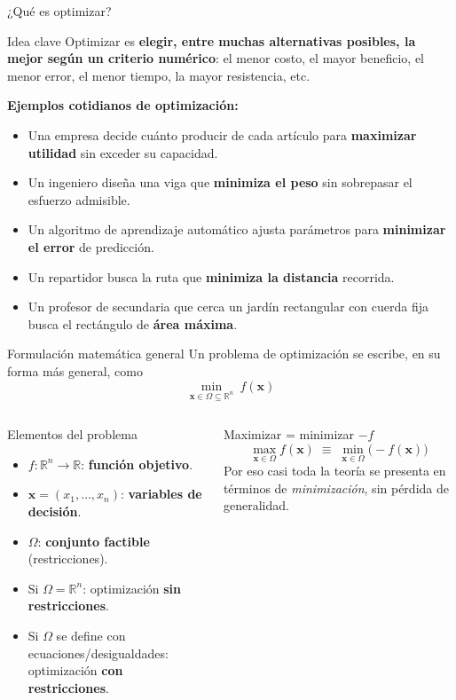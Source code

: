 \documentclass[aspectratio=169,10pt]{beamer}
\newcommand{\R}{\mathbb{R}}
\newcommand{\x}{\mathbf{x}}
\begin{document}
\begin{frame}{¿Qué es optimizar?}
  \begin{alertblock}{Idea clave}
    Optimizar es \textbf{elegir, entre muchas alternativas posibles, la mejor
    según un criterio numérico}: el menor costo, el mayor beneficio, el menor
    error, el menor tiempo, la mayor resistencia, etc.
  \end{alertblock}
  \vspace{0.3cm}
  \textbf{Ejemplos cotidianos de optimización:}
  \begin{itemize}
    \item Una empresa decide cuánto producir de cada artículo para
      \textbf{maximizar utilidad} sin exceder su capacidad.
    \item Un ingeniero diseña una viga que \textbf{minimiza el peso} sin
      sobrepasar el esfuerzo admisible.
    \item Un algoritmo de aprendizaje automático ajusta parámetros para
      \textbf{minimizar el error} de predicción.
    \item Un repartidor busca la ruta que \textbf{minimiza la distancia}
      recorrida.
    \item Un profesor de secundaria que cerca un jardín rectangular con
      cuerda fija busca el rectángulo de \textbf{área máxima}.
  \end{itemize}
\end{frame}

\begin{frame}{Formulación matemática general}
  Un problema de optimización se escribe, en su forma más general, como
  \[
    \min_{\x \in \Omega \subseteq \R^n} \ f(\x)
  \]
  \begin{columns}
    \begin{block}{Elementos del problema}
      \begin{itemize}
        \item $f:\R^n\to\R$: \textbf{función objetivo}.
        \item $\x = (x_1,\dots,x_n)$: \textbf{variables de decisión}.
        \item $\Omega$: \textbf{conjunto factible} (restricciones).
        \item Si $\Omega = \R^n$: optimización \textbf{sin restricciones}.
        \item Si $\Omega$ se define con ecuaciones/desigualdades:
          optimización \textbf{con restricciones}.
      \end{itemize}
    \end{block}
    \begin{exampleblock}{Maximizar = minimizar $-f$}
      \[
        \max_{\x\in\Omega} f(\x) \; \equiv \; \min_{\x\in\Omega} \big(-f(\x)\big)
      \]
      Por eso casi toda la teoría se presenta en términos de
      \emph{minimización}, sin pérdida de generalidad.
    \end{exampleblock}
  \end{columns}
\end{frame}
\end{document}
